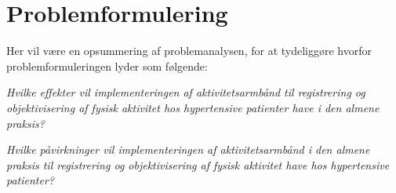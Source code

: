 \section{Problemformulering}

Her vil være en opsummering af problemanalysen, for at tydeliggøre hvorfor problemformuleringen lyder som følgende:

\textit{Hvilke effekter vil implementeringen af aktivitetsarmbånd til registrering og objektivisering af fysisk aktivitet hos hypertensive patienter have i den almene praksis?}

\textit{Hvilke påvirkninger vil implementeringen af aktivitetsarmbånd i den almene praksis til registrering og objektivisering af fysisk aktivitet have hos hypertensive patienter?}